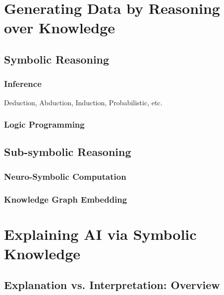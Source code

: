 \documentclass[12pt,a4paper,openright,twoside]{book}
\begin{document}
\chapter{Generating Data by Reasoning over Knowledge}

\section{Symbolic Reasoning}

\subsection{Inference}

Deduction, Abduction, Induction, Probabilistic, etc.

\subsection{Logic Programming}

\cite{logictech-information11}
\cite{lptech4mas-aamas2021}
\cite{lptech4mas-jaamas35}
\cite{Korner2020HistoryFuturePrologTPLP}

\section{Sub-symbolic Reasoning}

\subsection{Neuro-Symbolic Computation}

\subsection{Knowledge Graph Embedding}

\chapter{Explaining AI via Symbolic Knowledge}

\cite{ccnavos-extraamas2021-expectation}

\section{Explanation vs. Interpretation: Overview}

\cite{agentbasedxai-aamas2020}
\cite{agentbasedxai-extraamas2020}
\end{document}
